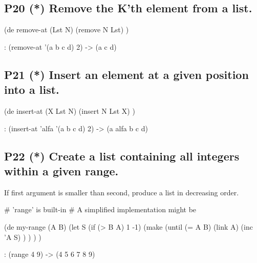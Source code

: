 \pagebreak{}
\subsection*{{P20} (*) Remove the K'th element from a
list.}
\label{sec:99-problems-P20}

\begin{wideverbatim}

(de remove-at (Lst N)
   (remove N Lst) )

\end{wideverbatim}

\begin{wideverbatim}
   : (remove-at '(a b c d) 2)
   -> (a c d)
\end{wideverbatim}

\subsection*{{P21} (*) Insert an element at a given
position into a list.}
\label{sec:99-problems-P21}

\begin{wideverbatim}

(de insert-at (X Lst N)
   (insert N Lst X) )

\end{wideverbatim}

\begin{wideverbatim}
   : (insert-at 'alfa '(a b c d) 2)
   -> (a alfa b c d)
\end{wideverbatim}

\subsection*{{P22} (*) Create a list containing all
integers within a given range.}
\label{sec:99-problems-P22}

If first argument is smaller than second, produce a list in decreasing
order.

\begin{wideverbatim}

# 'range' is built-in
# A simplified implementation might be

(de my-range (A B)
   (let S (if (> B A) 1 -1)
      (make
         (until (= A B)
            (link A)
            (inc 'A S) ) ) ) )

\end{wideverbatim}

\begin{wideverbatim}
   : (range 4 9)
   -> (4 5 6 7 8 9)
\end{wideverbatim}


